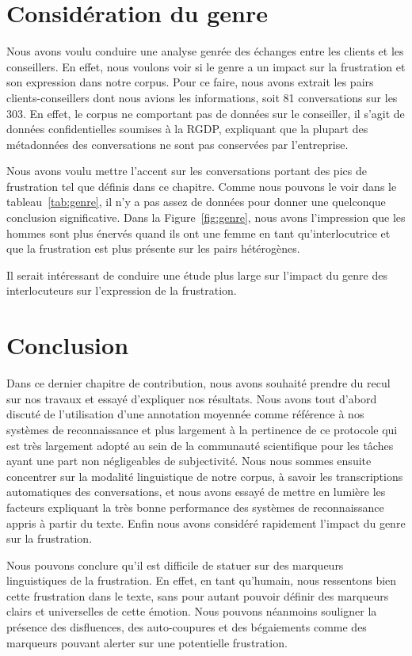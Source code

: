 \section{Considération du genre}
Nous avons voulu conduire une analyse genrée des échanges entre les clients et les conseillers. En effet, nous voulons voir si le genre a un impact sur la frustration et son expression dans notre corpus. Pour ce faire, nous avons extrait les pairs clients-conseillers dont nous avions les informations, soit 81 conversations sur les 303. En effet, le corpus ne comportant pas de données sur le conseiller, il s'agit de données confidentielles soumises à la RGDP, expliquant que la plupart des métadonnées des conversations ne sont pas conservées par l'entreprise.



Nous avons voulu mettre l'accent sur les conversations portant des pics de frustration tel que définis dans ce chapitre. Comme nous pouvons le voir dans le tableau~\ref{tab:genre}, il n'y a pas assez de données pour donner une quelconque conclusion significative. Dans la Figure~\ref{fig:genre}, nous avons l'impression que les hommes sont plus énervés quand ils ont une femme en tant qu'interlocutrice et que la frustration est plus présente sur les pairs hétérogènes.



 Il serait intéressant de conduire une étude plus large sur l'impact du genre des interlocuteurs sur l'expression de la frustration.

\section{Conclusion}
Dans ce dernier chapitre de contribution, nous avons souhaité prendre du recul sur nos travaux et essayé d'expliquer nos résultats. Nous avons tout d'abord discuté de l'utilisation d'une annotation moyennée comme référence à nos systèmes de reconnaissance et plus largement à la pertinence de ce protocole qui est très largement adopté au sein de la communauté scientifique pour les tâches ayant une part non négligeables de subjectivité. Nous nous sommes ensuite concentrer sur la modalité linguistique de notre corpus, à savoir les transcriptions automatiques des conversations, et nous avons essayé de mettre en lumière les facteurs expliquant la très bonne performance des systèmes de reconnaissance appris à partir du texte. Enfin nous avons considéré rapidement l'impact du genre sur la frustration.

Nous pouvons conclure qu'il est difficile de statuer sur des marqueurs linguistiques de la frustration. En effet, en tant qu'humain, nous ressentons bien cette frustration dans le texte, sans pour autant pouvoir définir des marqueurs clairs et universelles de cette émotion. Nous pouvons néanmoins souligner la présence des disfluences, des auto-coupures et des bégaiements comme des marqueurs pouvant alerter sur une potentielle frustration.
